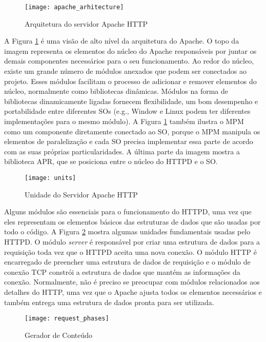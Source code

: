 \begin{figure}[!h]
  \centering
  \texttt{[image: apache\_arhitecture]} 
	\caption[Arquitetura do servidor Apache HTTP]{Arquitetura do servidor Apache HTTP \citep{apache_module_book}}
  \label{fig:apache_architecture} 
\end{figure}

A Figura \ref{fig:apache_architecture} é uma visão de alto nível da arquitetura
do Apache. O topo da imagem representa os elementos do núcleo do Apache
responsáveis por juntar os demais componentes necessários para o seu
funcionamento. Ao redor do núcleo, existe um grande número de módulos anexados
que podem ser conectados ao projeto. Esses módulos facilitam o processo de
adicionar e remover elementos do núcleo, normalmente como bibliotecas
dinâmicas. Módulos na forma de bibliotecas dinamicamente ligadas fornecem
flexibilidade, um bom desempenho e portabilidade entre diferentes SOs (e.g.,
Window e Linux podem ter diferentes implementações para o mesmo módulo). A
Figura \ref{fig:apache_architecture} também ilustra o MPM como um componente
diretamente conectado ao SO, porque o MPM manipula os elementos de
paralelização e cada SO precisa implementar essa parte de acordo com as suas
próprias particularidades. A última parte da imagem mostra a biblioteca APR,
que se posiciona entre o núcleo do HTTPD e o SO.

\begin{figure}[!h]
  \centering
  \texttt{[image: units]} 
  \caption{Unidade do Servidor Apache HTTP}
  \label{fig:units} 
\end{figure}

Alguns módulos são essenciais para o funcionamento do HTTPD, uma vez que eles
representam os elementos básicos das estruturas de dados que são usadas por
todo o código. A Figura \ref{fig:units} mostra algumas unidades fundamentais
usadas pelo HTTPD. O módulo \emph{server} é responsável por criar uma estrutura de
dados para a requisição toda vez que o HTTPD aceita uma nova conexão. O módulo
HTTP é encarregado de preencher uma estrutura de dados de requisição e o
módulo de conexão TCP constrói a estrutura de dados que mantém as informações
da conexão. Normalmente, não é preciso se preocupar com módulos relacionados
aos detalhes do HTTP, uma vez que o Apache ajusta todos os elementos necessários
e também entrega uma estrutura de dados pronta para ser utilizada.

\begin{figure}[!h]
  \centering
  \texttt{[image: request\_phases]} 
	\caption[Gerador de Conteúdo]{Gerador de Conteúdo \citep{apache_module_book}}
  \label{fig:content_generator} 
\end{figure}

